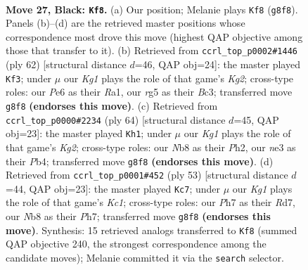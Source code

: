 \documentclass[11pt]{article}
\begin{document}
\clearpage

\begin{figure}[p]\centering
\begin{subfigure}{0.46\textwidth}\centering
\resizebox{\linewidth}{!}{%
\newchessgame
\chessboard[
  setfen={rn4k1/p4ppp/4p3/6R1/PP5P/4Nb2/8/R1K5 b - - 0 27},
  showmover=false,
  pgfstyle=straightmove, color=movearrow, markmove={g8-f8}
]}
\caption{}
\end{subfigure}\hfill
\begin{subfigure}{0.46\textwidth}\centering
\resizebox{\linewidth}{!}{%
\newchessgame
\chessboard[
  setfen={r5k1/1p4p1/2n1pp2/7p/P6P/2B1P1P1/5PK1/R7 w - - 0 32},
  showmover=false,
  pgfstyle=straightmove, color=movearrow, markmove={g2-f3}
]}
\caption{}
\end{subfigure}
\\[4pt]
\begin{subfigure}{0.46\textwidth}\centering
\resizebox{\linewidth}{!}{%
\newchessgame
\chessboard[
  setfen={5r1k/pp4p1/7p/3RPr2/1P6/P3P3/6KP/2R5 w - - 2 33},
  showmover=false,
  pgfstyle=straightmove, color=movearrow, markmove={g2-h1}
]}
\caption{}
\end{subfigure}\hfill
\begin{subfigure}{0.46\textwidth}\centering
\resizebox{\linewidth}{!}{%
\newchessgame
\chessboard[
  setfen={2k5/p2r2pp/1p6/2pb4/7P/P7/3R2P1/2K1R3 b - - 3 27},
  showmover=false,
  pgfstyle=straightmove, color=movearrow, markmove={c8-c7}
]}
\caption{}
\end{subfigure}
\caption{\textbf{Move 27, Black: \texttt{Kf8}.} (a) Our position; Melanie plays \texttt{Kf8} (\texttt{g8f8}). Panels (b)--(d) are the retrieved master positions whose correspondence most drove this move (highest QAP objective among those that transfer to it). (b) Retrieved from \texttt{ccrl\_top\_p0002\#1446} (ply 62) [structural distance $d$=46, QAP obj=24]: the master played \texttt{Kf3}; under $\mu$ our \emph{Kg1} plays the role of that game's \emph{Kg2}; cross-type roles: our \emph{P}e6 as their \emph{R}a1, our \emph{r}g5 as their \emph{B}c3; transferred move \texttt{g8f8} \textbf{(endorses this move)}. (c) Retrieved from \texttt{ccrl\_top\_p0000\#2234} (ply 64) [structural distance $d$=45, QAP obj=23]: the master played \texttt{Kh1}; under $\mu$ our \emph{Kg1} plays the role of that game's \emph{Kg2}; cross-type roles: our \emph{N}b8 as their \emph{P}h2, our \emph{n}e3 as their \emph{P}b4; transferred move \texttt{g8f8} \textbf{(endorses this move)}. (d) Retrieved from \texttt{ccrl\_top\_p0001\#452} (ply 53) [structural distance $d$=44, QAP obj=23]: the master played \texttt{Kc7}; under $\mu$ our \emph{Kg1} plays the role of that game's \emph{Kc1}; cross-type roles: our \emph{P}h7 as their \emph{R}d7, our \emph{N}b8 as their \emph{P}h7; transferred move \texttt{g8f8} \textbf{(endorses this move)}. Synthesis: 15 retrieved analogs transferred to \texttt{Kf8} (summed QAP objective 240, the strongest correspondence among the candidate moves); Melanie committed it via the \texttt{search} selector.}
\label{fig:thought-m53}
\end{figure}
\end{document}
